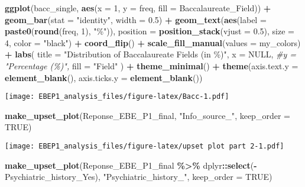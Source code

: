 \documentclass[
]{article}
\newenvironment{Shaded}{\begin{snugshade}}{\end{snugshade}}
\newcommand{\AttributeTok}[1]{\textcolor[rgb]{0.13,0.29,0.53}{#1}}
\newcommand{\CommentTok}[1]{\textcolor[rgb]{0.56,0.35,0.01}{\textit{#1}}}
\newcommand{\ConstantTok}[1]{\textcolor[rgb]{0.56,0.35,0.01}{#1}}
\newcommand{\DecValTok}[1]{\textcolor[rgb]{0.00,0.00,0.81}{#1}}
\newcommand{\FloatTok}[1]{\textcolor[rgb]{0.00,0.00,0.81}{#1}}
\newcommand{\FunctionTok}[1]{\textcolor[rgb]{0.13,0.29,0.53}{\textbf{#1}}}
\newcommand{\NormalTok}[1]{#1}
\newcommand{\SpecialCharTok}[1]{\textcolor[rgb]{0.81,0.36,0.00}{\textbf{#1}}}
\newcommand{\StringTok}[1]{\textcolor[rgb]{0.31,0.60,0.02}{#1}}
\begin{document}
\begin{Shaded}
\begin{Highlighting}[]
\FunctionTok{ggplot}\NormalTok{(bacc\_single, }\FunctionTok{aes}\NormalTok{(}\AttributeTok{x =} \DecValTok{1}\NormalTok{, }\AttributeTok{y =}\NormalTok{ freq, }\AttributeTok{fill =}\NormalTok{ Baccalaureate\_Field)) }\SpecialCharTok{+}
  \FunctionTok{geom\_bar}\NormalTok{(}\AttributeTok{stat =} \StringTok{"identity"}\NormalTok{, }\AttributeTok{width =} \FloatTok{0.5}\NormalTok{) }\SpecialCharTok{+}
  \FunctionTok{geom\_text}\NormalTok{(}\FunctionTok{aes}\NormalTok{(}\AttributeTok{label =} \FunctionTok{paste0}\NormalTok{(}\FunctionTok{round}\NormalTok{(freq, }\DecValTok{1}\NormalTok{), }\StringTok{"\%"}\NormalTok{)),}
            \AttributeTok{position =} \FunctionTok{position\_stack}\NormalTok{(}\AttributeTok{vjust =} \FloatTok{0.5}\NormalTok{), }\AttributeTok{size =} \DecValTok{4}\NormalTok{, }\AttributeTok{color =} \StringTok{"black"}\NormalTok{) }\SpecialCharTok{+}
  \FunctionTok{coord\_flip}\NormalTok{() }\SpecialCharTok{+}
  \FunctionTok{scale\_fill\_manual}\NormalTok{(}\AttributeTok{values =}\NormalTok{ my\_colors) }\SpecialCharTok{+}
  \FunctionTok{labs}\NormalTok{(}
    \AttributeTok{title =} \StringTok{"Distribution of Baccalaureate Fields (in \%)"}\NormalTok{,}
    \AttributeTok{x =} \ConstantTok{NULL}\NormalTok{,}
    \CommentTok{\#y = "Percentage (\%)",}
    \AttributeTok{fill =} \StringTok{"Field"}
\NormalTok{  ) }\SpecialCharTok{+}
  \FunctionTok{theme\_minimal}\NormalTok{() }\SpecialCharTok{+}
  \FunctionTok{theme}\NormalTok{(}\AttributeTok{axis.text.y =} \FunctionTok{element\_blank}\NormalTok{(), }\AttributeTok{axis.ticks.y =} \FunctionTok{element\_blank}\NormalTok{())}
\end{Highlighting}
\end{Shaded}

\texttt{[image: EBEP1\_analysis\_files/figure-latex/Bacc-1.pdf]}

\begin{Shaded}
\begin{Highlighting}[]
\FunctionTok{make\_upset\_plot}\NormalTok{(Reponse\_EBE\_P1\_final, }\StringTok{"Info\_source\_"}\NormalTok{, }\AttributeTok{keep\_order =} \ConstantTok{TRUE}\NormalTok{)}
\end{Highlighting}
\end{Shaded}

\texttt{[image: EBEP1\_analysis\_files/figure-latex/upset plot part 2-1.pdf]}

\begin{Shaded}
\begin{Highlighting}[]
\FunctionTok{make\_upset\_plot}\NormalTok{(Reponse\_EBE\_P1\_final }\SpecialCharTok{\%\textgreater{}\%}\NormalTok{ dplyr}\SpecialCharTok{::}\FunctionTok{select}\NormalTok{(}\SpecialCharTok{{-}}\NormalTok{Psychiatric\_history\_Yes), }\StringTok{"Psychiatric\_history\_"}\NormalTok{, }\AttributeTok{keep\_order =} \ConstantTok{TRUE}\NormalTok{)}
\end{Highlighting}
\end{Shaded}
\end{document}

